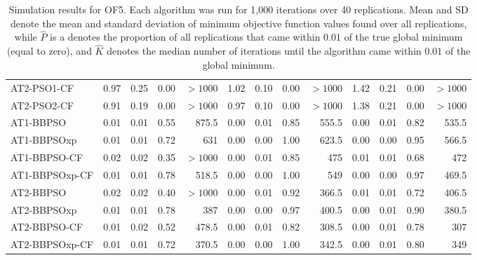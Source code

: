 \documentclass[cmbright]{staauth}
\numberwithin{table}{section}
\begin{document}
\begin{table}[ht]
\begin{tabular}{l|rrrr|rrrr|rrrr}
  AT2-PSO1-CF & 0.97 & 0.25 & 0.00 & $> 1000$ & 1.02 & 0.10 & 0.00 & $> 1000$ & 1.42 & 0.21 & 0.00 & $> 1000$ \\
  AT2-PSO2-CF & 0.91 & 0.19 & 0.00 & $> 1000$ & 0.97 & 0.10 & 0.00 & $> 1000$ & 1.38 & 0.21 & 0.00 & $> 1000$ \\
   \hline
AT1-BBPSO & 0.01 & 0.01 & 0.55 & 875.5 & 0.00 & 0.01 & 0.85 & 555.5 & 0.00 & 0.01 & 0.82 & 535.5 \\
  AT1-BBPSOxp & 0.01 & 0.01 & 0.72 & 631 & 0.00 & 0.00 & 1.00 & 623.5 & 0.00 & 0.00 & 0.95 & 566.5 \\
  AT1-BBPSO-CF & 0.02 & 0.02 & 0.35 & $> 1000$ & 0.00 & 0.01 & 0.85 & 475 & 0.01 & 0.01 & 0.68 & 472 \\
  AT1-BBPSOxp-CF & 0.01 & 0.01 & 0.78 & 518.5 & 0.00 & 0.00 & 1.00 & 549 & 0.00 & 0.00 & 0.97 & 469.5 \\
   \hline
AT2-BBPSO & 0.02 & 0.02 & 0.40 & $> 1000$ & 0.00 & 0.01 & 0.92 & 366.5 & 0.01 & 0.01 & 0.72 & 406.5 \\
  AT2-BBPSOxp & 0.01 & 0.01 & 0.78 & 387 & 0.00 & 0.00 & 0.97 & 400.5 & 0.00 & 0.01 & 0.90 & 380.5 \\
  AT2-BBPSO-CF & 0.01 & 0.02 & 0.52 & 478.5 & 0.00 & 0.01 & 0.82 & 308.5 & 0.00 & 0.01 & 0.78 & 307 \\
  AT2-BBPSOxp-CF & 0.01 & 0.01 & 0.72 & 370.5 & 0.00 & 0.00 & 1.00 & 342.5 & 0.00 & 0.01 & 0.80 & 349 \\
   \hline
\end{tabular}
\endgroup
\caption{Simulation results for OF5. Each algorithm was run for 1,000 iterations over 40 replications. Mean and SD denote the mean and standard deviation of minimum objective function values found over all replications, while $\widehat{P}$ is a denotes the proportion of all replications that came within $0.01$ of the true global minimum (equal to zero), and $\widehat{K}$ denotes the median number of iterations until the algorithm came within $0.01$ of the global minimum.}
\label{tab:psosim5}
\end{table}
\end{document}
